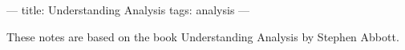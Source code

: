 ---
title: Understanding Analysis
tags: analysis
---

These notes are based on the book Understanding Analysis by Stephen Abbott.
